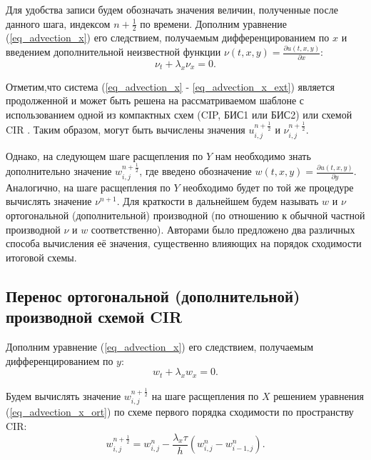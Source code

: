 \documentclass[11pt]{article}
\begin{document}
Для удобства записи будем обозначать значения величин, полученные после данного шага, индексом $n + \frac{1}{2}$ по времени.
Дополним уравнение (\ref{eq_advection_x}) его следствием, получаемым дифференцированием по $x$ и введением дополнительной неизвестной функции $\nu(t, x, y) = \frac{\partial u(t, x, y)}{\partial x}$:
\begin{equation}
\label{eq_advection_x_ext}
\nu_t + \lambda_x \nu_x = 0.
\end{equation}

Отметим,что система (\ref{eq_advection_x} - \ref{eq_advection_x_ext}) является продолженной и может быть решена на рассматриваемом шаблоне с использованием одной из компактных схем (CIP, БИС1 или БИС2) \cite{Khokhlov_NEW} или схемой CIR \cite{Courant1952}.
Таким образом, могут быть вычислены значения $u^{n + \frac{1}{2}}_{i, j}$ и $\nu^{n + \frac{1}{2}}_{i, j}$.

Однако, на следующем шаге расщепления по $Y$ нам необходимо знать дополнительно значение $w^{n + \frac{1}{2}}_{i, j}$, где введено обозначение $w(t, x, y) = \frac{\partial u(t, x, y)}{\partial y}$. Аналогично, на шаге расщепления по $Y$ необходимо будет по той же процедуре вычислять значение $\nu^{n + 1}$.
Для краткости в дальнейшем будем называть $w$ и $\nu$ ортогональной (дополнительной) производной (по отношению к обычной частной производной $\nu$ и $w$ соответственно).
Авторами было предложено два различных способа вычисления её значения, существенно влияющих на порядок сходимости итоговой схемы.

\subsection{Перенос ортогональной (дополнительной) производной схемой CIR}

Дополним уравнение (\ref{eq_advection_x}) его следствием, получаемым дифференцированием по $y$:
\begin{equation}
\label{eq_advection_x_ort}
w_t + \lambda_x w_x = 0.
\end{equation}

Будем вычислять значение $w^{n + \frac{1}{2}}_{i, j}$ на шаге расщепления по $X$ решением уравнения (\ref{eq_advection_x_ort}) по схеме первого порядка сходимости по пространству CIR:
\begin{equation}
\label{eq_advection_x_ort_g}
w^{n + \frac{1}{2}}_{i, j} = w^{n}_{i, j} - \frac{\lambda_x\tau}{h}(w^{n}_{i, j} - w^{n}_{i - 1, j}).
\end{equation}
\end{document}
